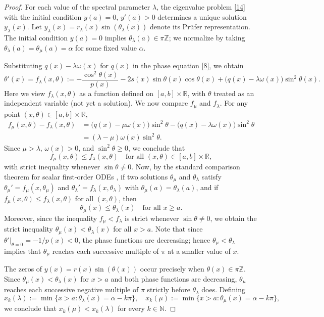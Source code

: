 \documentclass[11pt, reqno]{amsart}
\numberwithin{equation}{section}  %
\theoremstyle{plain}
\theoremstyle{definition}
\theoremstyle{remark}
\begin{document}
\begin{proof}
For each value of the spectral parameter $\lambda$, the eigenvalue problem \eqref{14} with the initial condition $y(a) = 0$, $y'(a) > 0$ determines a unique solution $y_\lambda(x)$. Let $y_\lambda(x) = r_\lambda(x)\sin(\theta_\lambda(x))$ denote its Pr\"ufer representation. The initial condition $y(a) = 0$ implies $\theta_\lambda(a) \in \pi\mathbb{Z}$; we normalize by taking $\theta_\lambda(a) = \theta_\mu(a) = \alpha$ for some fixed value $\alpha$.

Substituting $q(x) - \lambda\omega(x)$ for $q(x)$ in the phase equation \eqref{8}, we obtain
\[
\theta'(x) = f_\lambda(x, \theta) := -\frac{\cos^2\theta(x)}{p(x)} - 2s(x)\sin\theta(x)\cos\theta(x) + \bigl(q(x) - \lambda\omega(x)\bigr)\sin^2\theta(x).
\]
Here we view $f_\lambda(x, \theta)$ as a function defined on $[a,b] \times \mathbb{R}$, with $\theta$ treated as an independent variable (not yet a solution).
We now compare $f_\mu$ and $f_\lambda$. For any point $(x, \theta) \in [a,b] \times \mathbb{R}$,
\begin{align*}
f_\mu(x, \theta) - f_\lambda(x, \theta) 
&= \bigl(q(x) - \mu\omega(x)\bigr)\sin^2\theta - \bigl(q(x) - \lambda\omega(x)\bigr)\sin^2\theta \\
&= (\lambda - \mu)\omega(x)\sin^2\theta.
\end{align*}
Since $\mu > \lambda$, $\omega(x) > 0$, and $\sin^2\theta \geq 0$, we conclude that
\[
f_\mu(x, \theta) \leq f_\lambda(x, \theta) \quad \text{for all } (x, \theta) \in [a,b] \times \mathbb{R},
\]
with strict inequality whenever $\sin\theta \neq 0$.
Now, by the standard comparison theorem for scalar first-order ODEs \cite{coddington1955}, if two solutions $\theta_\mu$ and $\theta_\lambda$ satisfy $\theta_\mu' = f_\mu(x, \theta_\mu)$ and $\theta_\lambda' = f_\lambda(x, \theta_\lambda)$ with $\theta_\mu(a) = \theta_\lambda(a)$, and if $f_\mu(x, \theta) \leq f_\lambda(x, \theta)$ for all $(x, \theta)$, then
\[
\theta_\mu(x) \leq \theta_\lambda(x) \quad \text{for all } x \geq a.
\]
Moreover, since the inequality $f_\mu < f_\lambda$ is strict whenever $\sin\theta \neq 0$, we obtain the strict inequality $\theta_\mu(x) < \theta_\lambda(x)$ for all $x > a$. Note that since $\theta'|_{\theta=0} = -1/p(x) < 0$, the phase functions are decreasing; hence $\theta_\mu < \theta_\lambda$ implies that $\theta_\mu$ reaches each successive multiple of $\pi$ at a smaller value of $x$.


The zeros of $y(x) = r(x)\sin(\theta(x))$ occur precisely when $\theta(x) \in \pi\mathbb{Z}$. Since $\theta_\mu(x) < \theta_\lambda(x)$ for $x > a$ and both phase functions are decreasing, $\theta_\mu$ reaches each successive negative multiple of $\pi$ strictly before $\theta_\lambda$ does. Defining
\[
x_k(\lambda) := \min\{x > a : \theta_\lambda(x) = \alpha - k\pi\}, \quad x_k(\mu) := \min\{x > a : \theta_\mu(x) = \alpha - k\pi\},
\]
we conclude that $x_k(\mu) < x_k(\lambda)$ for every $k \in \mathbb{N}$.
\end{proof}
\end{document}
